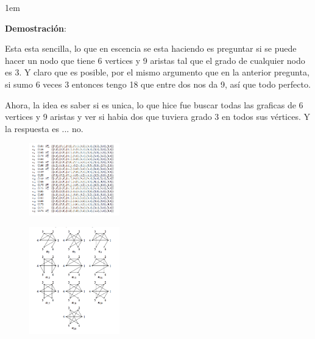 \documentclass[12pt, fleqn]{article}                            %
\newenvironment{SmallIndentation}[1][0.75em]                    %
        {\begin{adjustwidth}{#1}{}\begin{footnotesize}}             %
        {\end{footnotesize}\end{adjustwidth}}                       %
\theoremstyle{break}                                            %
\begin{document}
    \begin{SmallIndentation}[1em]
        \textbf{Demostración}:
    
        Esta esta sencilla, lo que en escencia se esta haciendo es preguntar si se puede hacer un nodo que tiene
        6 vertices y 9 aristas tal que el grado de cualquier nodo es 3. Y claro que es posible, por el mismo argumento
        que en la anterior pregunta, si sumo 6 veces 3 entonces tengo 18 que entre dos nos da 9, así que todo perfecto.

        Ahora, la idea es saber si es unica, lo que hice fue buscar todas las graficas de 6 vertices y 9 aristas y ver si
        habia dos que tuviera grado 3 en todos sus vértices.
        Y la respuesta es ... no.

        \begin{figure}[h]
            \centering
            \includegraphics[width=0.35\textwidth]{Question91}
        \end{figure}

        \begin{figure}[h]
            \centering
            \includegraphics[width=0.35\textwidth]{Question92}
        \end{figure}
    
    \end{SmallIndentation}



    \clearpage
\end{document}

